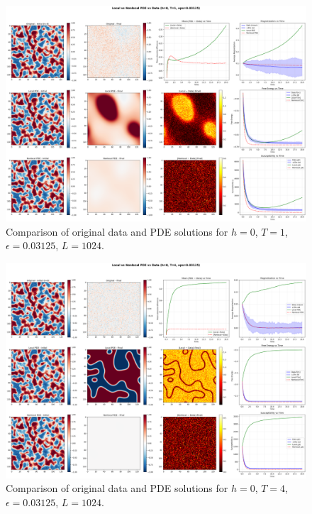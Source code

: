 \documentclass[11pt,a4paper]{article}
\begin{document}

\begin{figure}[!h]
    \centering
    \includegraphics[width=1.0\textwidth]{fig/compare_local_nonlocal_L1024_h0_T1_eps0.03125.png}
    \caption{Comparison of original data and PDE solutions for $h=0$, $T=1$, $\epsilon=0.03125$, $L=1024$.}
    \label{fig:pde_comparison_h0_T1_eps0.03125}
\end{figure}


\begin{figure}[h]
    \centering
    \includegraphics[width=1.0\textwidth]{fig/compare_local_nonlocal_L1024_h0_T4_eps0.03125.png}
    \caption{Comparison of original data and PDE solutions for $h=0$, $T=4$, $\epsilon=0.03125$, $L=1024$.}
    \label{fig:pde_comparison_h0_T4_eps0.03125}
\end{figure}
\end{document}
